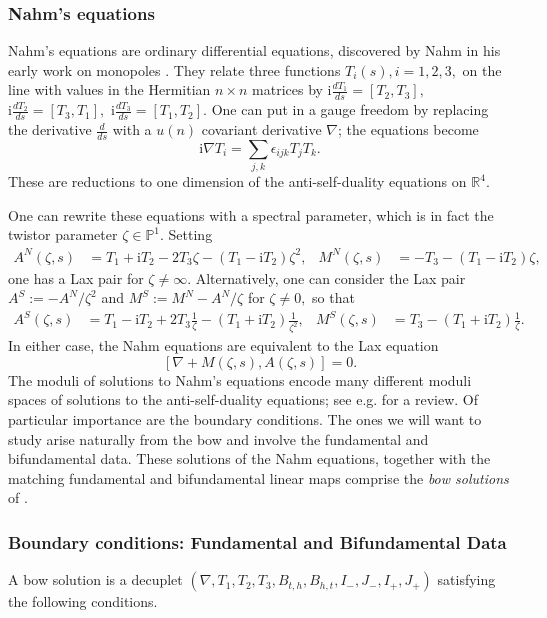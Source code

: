\documentclass[12pt]{article}
\theoremstyle{definition}
\theoremstyle{remark}
\numberwithin{theorem}{section}
\renewcommand{\i}{\mathrm{i}}
\def\bR{{\mathbb {R}}}
\begin{document}
 \subsubsection{Nahm's equations}

Nahm's equations are ordinary differential equations, discovered by Nahm in his early work on monopoles \cite{Nahm1983}. They relate three functions $T_i(s), i=1,2,3,$ on the line with values in the Hermitian $n\times n$ matrices by 
$\i\frac{dT_1}{ds} = [T_2,T_3],$ 
$\i\frac{dT_2}{ds} = [T_3,T_1],$ 
$\i\frac{dT_3}{ds} = [T_1,T_2].$
One can put in a gauge freedom by replacing the derivative $\frac{d}{ds}$ with a $u(n)$  covariant  derivative
$\nabla$; the equations become 
\begin{equation} \i\nabla T_i =\sum_{j,k} \epsilon_{ijk} T_j T_k.\end{equation}
These are reductions to one dimension of the anti-self-duality equations on $\bR^4$.

One can rewrite these equations with a spectral parameter, which is in fact the twistor parameter $\zeta\in\mathbb{P}^1.$ Setting 
\begin{align*}
A^N(\zeta,s) &= T_1 +\i T_2 -2 T_3\zeta - (T_1-\i T_2)\zeta^2,&
M^N(\zeta,s) & =  -T_3- (T_1-\i T_2)\zeta,
\end{align*}
one has a Lax pair for $\zeta\neq\infty.$ 
Alternatively, one can consider the Lax pair $A^S:=-A^N/\zeta^2$ and $M^S:=M^N-A^N/\zeta$ for $\zeta\neq 0,$ so that
\begin{align*}
A^S(\zeta,s) &= T_1 -\i T_2 +2T_3\frac{1}{\zeta} - (T_1+\i T_2)\frac{1}{\zeta^2},&
M^S(\zeta,s) & =  T_3- (T_1+\i T_2)\frac{1}{\zeta}.
\end{align*}
In either case, the Nahm equations are equivalent to  the Lax equation
$$[\nabla+M(\zeta, s),A(\zeta,s)]  = 0.$$
The moduli of solutions to Nahm's equations encode many different moduli spaces of solutions to the anti-self-duality equations; see e.g. \cite{Jardim} for a review.  Of particular importance are the boundary conditions.  The ones we will want to study arise naturally from the bow and involve the fundamental and bifundamental data. These solutions of the Nahm equations, together with the matching fundamental and bifundamental linear maps comprise the {\em bow solutions} of \cite{Cherkis:2008ip,Cherkis:2010bn}.


\subsubsection{Boundary conditions: Fundamental and Bifundamental Data}\label{Bow}
A bow solution is a decuplet $(\nabla, T_1, T_2, T_3, B_{t,h},B_{h,t},I_-,J_-,I_+,J_+)$ satisfying the following conditions.
\medskip
\end{document}
